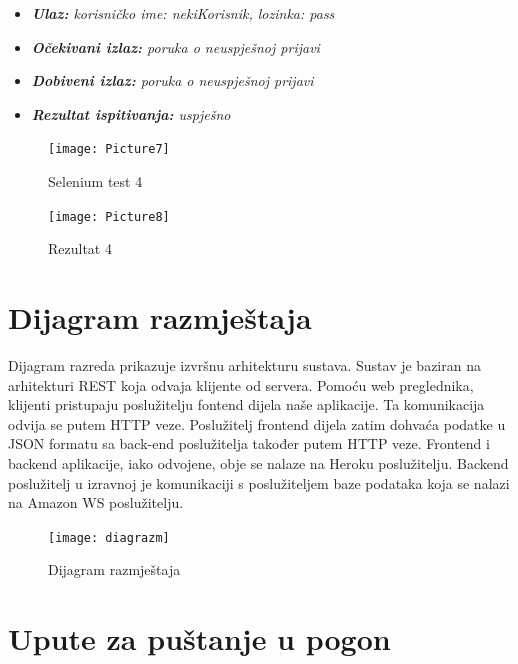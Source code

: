 \begin{itemize}
 	\item \textit{ \textbf{Ulaz: }korisničko ime: nekiKorisnik, lozinka: pass}
 	\item \textit{\textbf{Očekivani izlaz: }poruka o neuspješnoj prijavi }
 	\item \textit{\textbf{Dobiveni izlaz: }poruka o neuspješnoj prijavi }
 	\item \textit{\textbf{Rezultat ispitivanja: }uspješno}
 \end{itemize}
                \begin{figure}[H] 					\centering 					                \texttt{[image: Picture7]}
				\caption{Selenium test 4}
				\end{figure}
			    \begin{figure}[H] 					\centering 					\texttt{[image: Picture8]}
				\caption{Rezultat 4}
				\end{figure}
\eject 
		
		
		\section{Dijagram razmještaja}
			
			
Dijagram razreda prikazuje izvršnu arhitekturu sustava. Sustav je baziran na arhitekturi REST koja odvaja klijente od servera. Pomoću web preglednika, klijenti pristupaju poslužitelju fontend dijela naše aplikacije. Ta komunikacija odvija se putem HTTP veze. Poslužitelj frontend dijela zatim dohvaća podatke u JSON formatu sa back-end poslužitelja također putem HTTP veze. Frontend i backend aplikacije, iako odvojene, obje se nalaze na Heroku poslužitelju. Backend poslužitelj u izravnoj je komunikaciji s poslužiteljem baze podataka koja se nalazi na Amazon WS poslužitelju. 

\begin{figure}[H] 					\centering 					                \texttt{[image: diagrazm]}
				\caption{Dijagram razmještaja}
				\end{figure}


			
			\eject 
		
		\section{Upute za puštanje u pogon}
		
